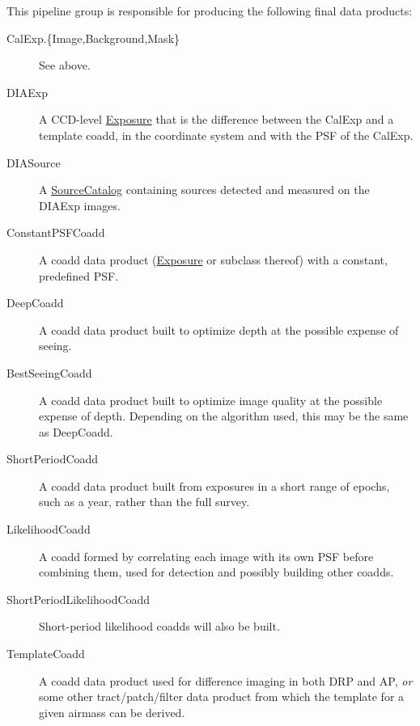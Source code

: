 This pipeline group is responsible for producing the following final data products:
\begin{description}
\item[CalExp.\{Image,Background,Mask\}]  See above.
\item[DIAExp] A CCD-level \hyperref[sec:spImagesExposure]{Exposure} that is the difference between the CalExp and a template coadd, in the coordinate system and with the PSF of the CalExp.
\item[DIASource] A \hyperref[sec:spTablesSource]{SourceCatalog} containing sources detected and measured on the DIAExp images.
\item[ConstantPSFCoadd] A coadd data product (\hyperref[sec:spImagesExposure]{Exposure} or subclass thereof) with a constant, predefined PSF.
\item[DeepCoadd] A coadd data product built to optimize depth at the possible expense of seeing.
\item[BestSeeingCoadd] A coadd data product built to optimize image quality at the possible expense of depth.  Depending on the algorithm used, this may be the same as DeepCoadd.
\item[ShortPeriodCoadd] A coadd data product built from exposures in a short range of epochs, such as a year, rather than the full survey.
\item[LikelihoodCoadd] A coadd formed by correlating each image with its own PSF before combining them, used for detection and possibly building other coadds.
\item[ShortPeriodLikelihoodCoadd] Short-period likelihood coadds will also be built.
\item[TemplateCoadd] A coadd data product used for difference imaging in both DRP and AP, \emph{or} some other tract/patch/filter data product from which the template for a given airmass can be derived.
\end{description}

